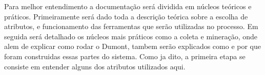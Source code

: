 Para melhor entendimento a documentação será dividida em núcleos teóricos e práticos. Primeiramente será dado toda a descrição teórica sobre a escolha de atributos, e funcionamento das ferramentas que serão utilizadas no processo. Em seguida será detalhado os núcleos mais práticos como a coleta e mineração, onde alem de explicar como rodar o Dumont, tambem serão explicados como e por que foram construidas essas partes do sistema. Como ja dito, a primeira etapa se consiste em entender alguns dos atributos utilizados aqui.



